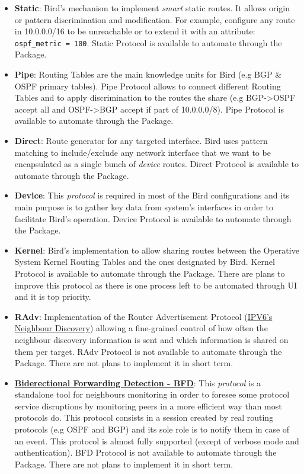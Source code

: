 \begin{itemize}
    \item \textbf{Static}: Bird's mechanism to implement \textit{smart} static routes. It allows  origin or pattern discrimination and modification. For example, configure any route in 10.0.0.0/16 to be unreachable or to extend it with an attribute: \texttt{ospf\_metric = 100}.
    Static Protocol is available to automate through the Package.
    \item \textbf{Pipe}: Routing Tables are the main knowledge units for Bird (e.g BGP \& OSPF primary tables). Pipe Protocol allows to connect different Routing Tables and to apply discrimination to the routes the share (e.g BGP->OSPF accept all and OSPF->BGP accept if part of 10.0.0.0/8).
    Pipe Protocol is available to automate through the Package.
    \item \textbf{Direct}: Route generator for any targeted interface. Bird uses pattern matching to include/exclude any network interface that we want to be encapsulated as a single bunch of \textit{device} routes.
    Direct Protocol is available to automate through the Package.
    \item \textbf{Device}: This \textit{protocol} is required in most of the Bird configurations and its main purpose is to gather key data from system's interfaces in order to facilitate Bird's operation.
    Device Protocol is available to automate through the Package.
    \item \textbf{Kernel}: Bird's implementation to allow sharing routes between the Operative System Kernel Routing Tables and the ones designated by Bird.
    Kernel Protocol is available to automate through the Package. There are plans to improve this protocol as there is one process left to be automated through UI and it is top priority.
    \item \textbf{RAdv}: Implementation of the Router Advertisement Protocol (\href{https://tools.ietf.org/html/rfc4861}{IPV6's Neighbour Discovery}) allowing a fine-grained control of how often the neighbour discovery information is sent and which information is shared on them per target.
    RAdv Protocol is not available to automate through the Package. There are not plans to implement it in short term.
    \item \textbf{\href{https://www.rfc-editor.org/rfc/rfc5880.txt}{Biderectional Forwarding Detection - BFD}}: This \textit{protocol} is a standalone tool for neighbours monitoring in order to foresee some protocol service disruptions by monitoring peers in a more efficient way than most protocols do. This protocol consists in a session created by real routing protocols (e.g OSPF and BGP) and its sole role is to notify them in case of an event. This protocol is almost fully supported (except of verbose mode and authentication).
    BFD Protocol is not available to automate through the Package. There are not plans to implement it in short term.
\end{itemize}

